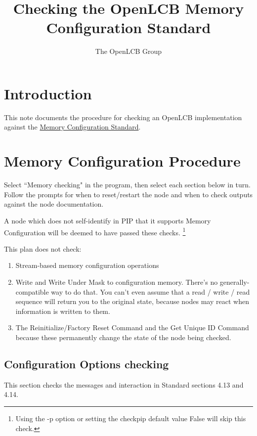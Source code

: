 \documentclass[11pt]{article}
\title{Checking the OpenLCB Memory Configuration Standard}
\author{The OpenLCB Group}
\begin{document}
\maketitle


\section{Introduction}

This note documents the procedure for checking an OpenLCB implementation against the 
\href{https://nbviewer.org/github/openlcb/documents/blob/master/standards/MemoryConfigurationS.pdf}
    {Memory Configuration Standard}.



\section{Memory Configuration Procedure}

Select ``Memory checking" in the program, 
then select each section below in turn.  Follow the prompts
for when to reset/restart the node and when to check 
outputs against the node documentation.

A node which does not self-identify in PIP that it supports
Memory Configuration will be deemed to have passed these checks.
\footnote{Using the -p option or setting the checkpip default value False will skip this check.}

This plan does not check:
\begin{enumerate}
\item Stream-based memory configuration operations
\item Write and Write Under Mask to configuration memory.  
There's no generally-compatible way to do that.
You can't even assume that a read / write / read sequence will return you to the original
state, because nodes may react when information is written to them.
\item The Reinitialize/Factory Reset Command and the Get Unique ID Command
because these permanently change the state of the node being checked.
\end{enumerate}

\subsection{Configuration Options checking}

This section checks the messages and interaction in Standard sections 4.13 and 4.14.
\end{document}
